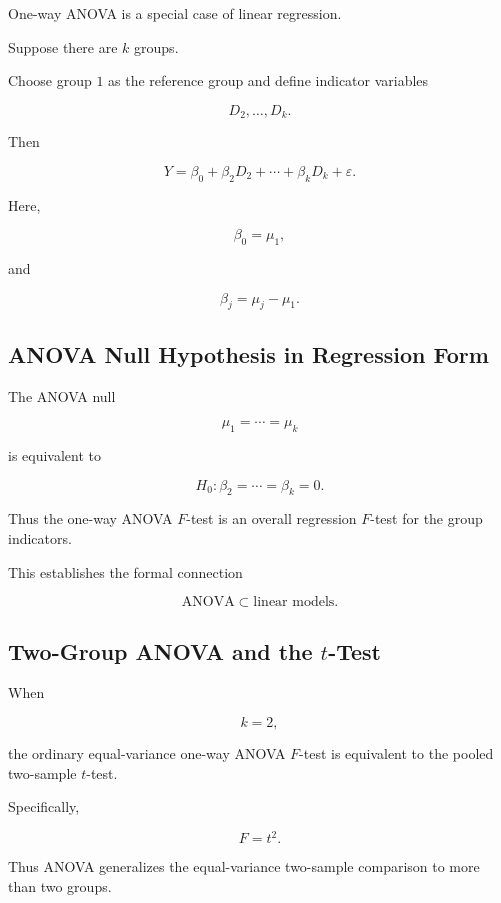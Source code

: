 One-way ANOVA is a special case of linear regression.

Suppose there are \(k\) groups.

Choose group \(1\) as the reference group and define indicator variables

\[
D_2,\ldots,D_k.
\]

Then

\[
\boxed{
Y
=
\beta_0
+
\beta_2D_2
+
\cdots
+
\beta_kD_k
+
\varepsilon.
}
\]

Here,

\[
\beta_0
=
\mu_1,
\]

and

\[
\boxed{
\beta_j
=
\mu_j-\mu_1.
}
\]

\subsection{ANOVA Null Hypothesis in Regression Form}
\label{subsec:anova-null-regression-form}

The ANOVA null

\[
\mu_1=\cdots=\mu_k
\]

is equivalent to

\[
\boxed{
H_0:
\beta_2
=
\cdots
=
\beta_k
=
0.
}
\]

Thus the one-way ANOVA \(F\)-test is an overall regression \(F\)-test for
the group indicators.

This establishes the formal connection

\[
\boxed{
\text{ANOVA}
\subset
\text{linear models}.
}
\]

\subsection{Two-Group ANOVA and the \(t\)-Test}
\label{subsec:two-group-anova-t-test}

When

\[
k=2,
\]

the ordinary equal-variance one-way ANOVA \(F\)-test is equivalent to the
pooled two-sample \(t\)-test.

Specifically,

\[
\boxed{
F=t^2.
}
\]

Thus ANOVA generalizes the equal-variance two-sample comparison to more
than two groups.

